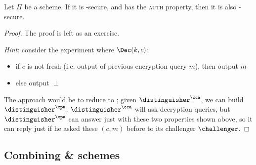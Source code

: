 \begin{theorem}
    Let $\Pi$ be a \ske{} scheme. If it is \cpa-secure, and has the \textsc{auth} property, then it is also \cca-secure.
\end{theorem}

\begin{proof} The proof is left as an exercise.

    \emph{Hint}: consider the experiment where $\Dec(k, c)$:

    \begin{itemize}
        \item if $c$ is not fresh (i.e. output of previous encryption query $m$),  then output $m$
        \item else output $\perp$
    \end{itemize}
    
    The approach would be to reduce \cca{} to \cpa; given $\distinguisher^{\cca}$, we can build $\distinguisher^{\cpa}$. $\distinguisher^{\cca}$ will ask decryption queries, but $\distinguisher^{\cpa}$ can answer just with these two properties shown above, so it can reply just if he asked these $(c, m)$ before to its challenger $\challenger$.

\end{proof}

\subsection{Combining \ske{} \& \mac{} schemes}

